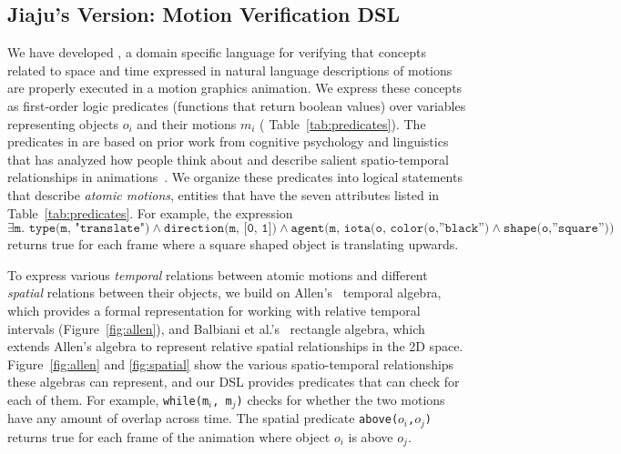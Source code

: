 
\subsection{Jiaju's Version: Motion Verification DSL}
We have developed \dslname{}, a domain specific language for verifying that concepts related to space and time expressed in natural language descriptions of motions are properly executed in a motion graphics animation.
%
We express these concepts as first-order logic predicates (functions that return boolean values) over variables representing objects $o_i$ and their motions $m_i$ ( Table~\ref{tab:predicates}).
%
The predicates in \dslname{} are based on prior work from cognitive psychology and linguistics that has analyzed how people think about and describe salient spatio-temporal relationships in animations~\cite{allen1983interval, talmy1975motion, Tversky}. 
We organize these predicates into logical statements that describe \textit{atomic motions}, entities that have the seven attributes listed in Table~\ref{tab:predicates}.
For example, the expression $ \exists \texttt{m. type(m, "translate")} \land \texttt{direction(m, [0, 1])} 
\land \texttt{agent(m, iota(o, color(o,''black'')} 
\land \texttt{shape(o,''square''))}$ returns true for each frame where a square shaped object is translating upwards.
%

To express various \textit{temporal} relations between atomic motions and different \textit{spatial} relations between their objects, we build on Allen's~ temporal algebra, which provides a formal representation for working with relative temporal intervals (Figure~\ref{fig:allen}), and Balbiani et al.'s~\shortcite{} rectangle algebra, which extends Allen's algebra to represent relative spatial relationships in the 2D space.
%
Figure~\ref{fig:allen} and \ref{fig:spatial} show the various spatio-temporal relationships these algebras can represent, and our DSL provides predicates that can check for each of them.
For example, \texttt{while(m$_i$, m$_j$)} checks for whether the two motions have any amount of overlap across time.
The spatial predicate {\tt above($o_i$,$o_j$)} returns true for each frame of the animation where object $o_i$ is above $o_j$. 

